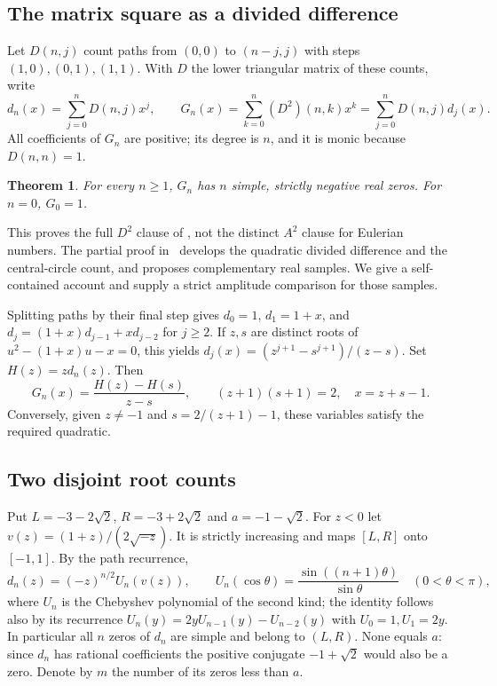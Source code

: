 \documentclass[11pt,a4paper]{article}
\numberwithin{equation}{section}
\newtheorem{theorem}{Theorem}[section]
\theoremstyle{definition}
\theoremstyle{remark}
\begin{document}
\subsection{The matrix square as a divided difference}
Let $D(n,j)$ count paths from $(0,0)$ to $(n-j,j)$ with steps $(1,0),(0,1),(1,1)$. With $D$ the lower triangular matrix of these counts, write
\[
 d_n(x)=\sum_{j=0}^n D(n,j)x^j,\qquad
 G_n(x)=\sum_{k=0}^n (D^2)(n,k)x^k
       =\sum_{j=0}^n D(n,j)d_j(x).
\]
All coefficients of $G_n$ are positive; its degree is $n$, and it is monic because $D(n,n)=1$.
\begin{theorem}
For every $n\ge1$, $G_n$ has $n$ simple, strictly negative real zeros. For $n=0$, $G_0=1$.
\end{theorem}
This proves the full $D^2$ clause of \cite[Conjecture~4.1]{r30keio:mw}, not the distinct $A^2$ clause for Eulerian numbers. The partial proof in~\cite{r30keio:partial} develops the quadratic divided difference and the central-circle count, and proposes complementary real samples. We give a self-contained account and supply a strict amplitude comparison for those samples.

Splitting paths by their final step gives $d_0=1$, $d_1=1+x$, and $d_j=(1+x)d_{j-1}+xd_{j-2}$ for $j\ge2$. If $z,s$ are distinct roots of $u^2-(1+x)u-x=0$, this yields $d_j(x)=(z^{j+1}-s^{j+1})/(z-s)$. Set $H(z)=zd_n(z)$. Then
\begin{equation}
 G_n(x)=\frac{H(z)-H(s)}{z-s},\qquad
 (z+1)(s+1)=2,\quad x=z+s-1.\label{r30keio:dd}
\end{equation}
Conversely, given $z\ne-1$ and $s=2/(z+1)-1$, these variables satisfy the required quadratic.

\subsection{Two disjoint root counts}
Put $L=-3-2\sqrt2$, $R=-3+2\sqrt2$ and $a=-1-\sqrt2$. For $z<0$ let $v(z)=(1+z)/(2\sqrt{-z})$. It is strictly increasing and maps $[L,R]$ onto $[-1,1]$. By the path recurrence,
\begin{equation}
 d_n(z)=(-z)^{n/2} U_n(v(z)),\qquad
 U_n(\cos\theta)=\frac{\sin((n+1)\theta)}{\sin\theta}\quad(0<\theta<\pi),\label{r30keio:cheb}
\end{equation}
where $U_n$ is the Chebyshev polynomial of the second kind; the identity follows also by its recurrence $U_n(y)=2yU_{n-1}(y)-U_{n-2}(y)$ with $U_0=1,U_1=2y$. In particular all $n$ zeros of $d_n$ are simple and belong to $(L,R)$. None equals $a$: since $d_n$ has rational coefficients the positive conjugate $-1+\sqrt2$ would also be a zero. Denote by $m$ the number of its zeros less than $a$.
\end{document}

